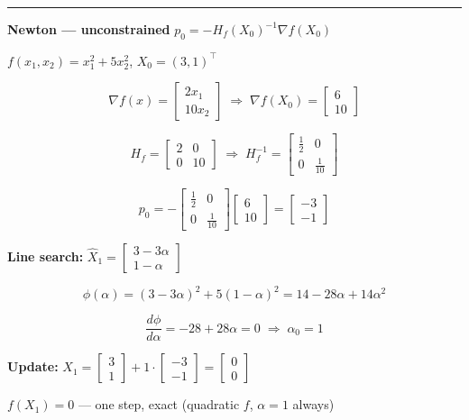 \documentclass[10pt,a3paper]{article}
\begin{document}
\vspace{8pt}

\noindent\rule{\linewidth}{0.4pt}

\vspace{4pt}

\noindent
\begin{minipage}[t]{0.46\linewidth}
\textbf{Newton — unconstrained} \quad $p_0 = -H_f(X_0)^{-1}\nabla f(X_0)$

$f(x_1,x_2)=x_1^2+5x_2^2$,\; $X_0=(3,1)^\top$

\[
  \nabla f(x) = \begin{bmatrix}2x_1\\10x_2\end{bmatrix}
  \;\Rightarrow\;
  \nabla f(X_0) = \begin{bmatrix}6\\10\end{bmatrix}
\]

\[
  H_f = \begin{bmatrix}2&0\\0&10\end{bmatrix}
  \;\Rightarrow\;
  H_f^{-1} = \begin{bmatrix}\tfrac{1}{2}&0\\0&\tfrac{1}{10}\end{bmatrix}
\]

\[
  p_0 = -\begin{bmatrix}\tfrac{1}{2}&0\\0&\tfrac{1}{10}\end{bmatrix}
         \begin{bmatrix}6\\10\end{bmatrix}
       = \begin{bmatrix}-3\\-1\end{bmatrix}
\]

\textbf{Line search:} $\hat{X}_1 = \begin{bmatrix}3-3\alpha\\1-\alpha\end{bmatrix}$

\[
  \phi(\alpha) = (3-3\alpha)^2+5(1-\alpha)^2 = 14-28\alpha+14\alpha^2
\]

\[
  \frac{d\phi}{d\alpha}=-28+28\alpha=0 \;\Rightarrow\; \alpha_0=1
\]

\textbf{Update:} $ 
  X_1 = \begin{bmatrix}3\\1\end{bmatrix}+1\cdot\begin{bmatrix}-3\\-1\end{bmatrix}
      = \begin{bmatrix}0\\0\end{bmatrix}
$

$f(X_1)=0$ — one step, exact (quadratic $f$, $\alpha=1$ always)

\end{minipage}\hfill
\end{document}
